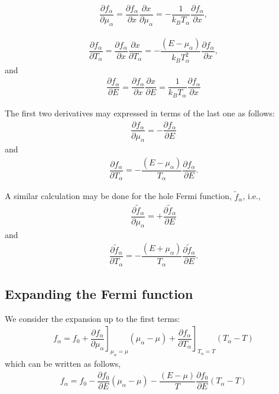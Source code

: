 \begin{align*}
\dfrac{\partial f_{\alpha}}{\partial \mu_{\alpha}}=\dfrac{\partial f_{\alpha}}{\partial x}\dfrac{\partial x}{\partial\mu_{\alpha}}=-\dfrac{1}{k_{B}T_{\alpha}}\dfrac{\partial f_{\alpha}}{\partial x},
\end{align*}

\begin{align*}
\dfrac{\partial f_{\alpha}}{\partial T_{\alpha}}=\dfrac{\partial f_{\alpha}}{\partial x}\dfrac{\partial x}{\partial T_{\alpha}}=-\dfrac{(E-\mu_{\alpha})}{k_{B}T^{2}_{\alpha}}\dfrac{\partial f_{\alpha}}{\partial x},
\end{align*}
and
\begin{align*}
\dfrac{\partial f_{\alpha}}{\partial E}=\dfrac{\partial f_{\alpha}}{\partial x}\dfrac{\partial x}{\partial E}=\dfrac{1}{k_{B}T_{\alpha}}\dfrac{\partial f_{\alpha}}{\partial x}
\end{align*}

The first two derivatives may expressed in terms of the last one as follows:
\begin{align}\label{first}
\dfrac{\partial f_{\alpha}}{\partial \mu_{\alpha}}=-\dfrac{\partial f_{\alpha}}{\partial E}
\end{align}
and
\begin{align}\label{second}
\dfrac{\partial f_{\alpha}}{\partial T_{\alpha}}=-\dfrac{(E-\mu_{\alpha})}{T_{\alpha}}\dfrac{\partial f_{\alpha}}{\partial E}.
\end{align}

A similar calculation may be done for the hole Fermi function, $\tilde{f}_{\alpha}$, i.e., 
\begin{align}\label{third}
\dfrac{\partial \tilde{f}_{\alpha}}{\partial \mu_{\alpha}}=+\dfrac{\partial \tilde{f}_{\alpha}}{\partial E}
\end{align}
and
\begin{align}\label{fourth}
\dfrac{\partial\tilde{f}_{\alpha}}{\partial T_{\alpha}}=-\dfrac{(E+\mu_{\alpha})}{T_{\alpha}}\dfrac{\partial \tilde{f}_{\alpha}}{\partial E}.
\end{align}

\subsection{Expanding the Fermi function}

We consider the expansion up to the first terms:
\begin{align*}
f_{\alpha}=f_{0}+\left.\dfrac{\partial f_{\alpha}}{\partial\mu_{\alpha}}\right]_{\mu_{\alpha}=\mu}(\mu_{\alpha}-\mu)
+
\left.\dfrac{\partial f_{\alpha}}{\partial T_{\alpha}}\right]_{T_{\alpha}=T}(T_{\alpha}-T)
\end{align*}
which can be written as follows,
\begin{align*}
f_{\alpha}=f_{0}-\dfrac{\partial f_{0}}{\partial E}(\mu_{\alpha}-\mu)
-
\dfrac{(E-\mu)}{T}\dfrac{\partial f_{0}}{\partial E}(T_{\alpha}-T)
\end{align*}

